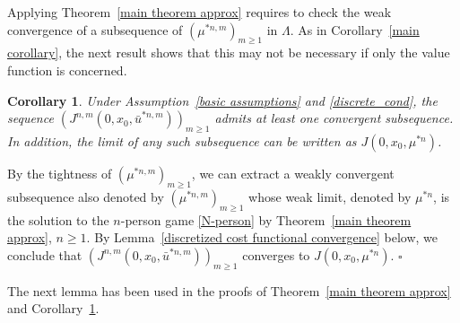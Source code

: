 \documentclass[12pt]{article}
\newtheorem{corollary}[prop]{Corollary}
\theoremstyle{named}
\numberwithin{equation}{section}
\newenvironment{Proof}{\removelastskip\par\medskip \noindent{\em Proof.} \rm}{\penalty-20\null\hfill$\square$\par\medbreak}
\begin{document}
\medskip
\noindent
Applying Theorem~\ref{main theorem approx} requires to check the
weak convergence of a subsequence of $( \mu^{*{n},{m}} )_{{m}\geq 1}$
in $\Lambda$.
As in Corollary~\ref{main corollary}, the next result
shows that this may not be necessary
 if only the value function is concerned.
\begin{corollary}
\label{main corollary approx}
  Under Assumption~\ref{basic assumptions} and \ref{discrete_cond},
  the sequence $(J^{{n},{m}}(0,x_0,\bar{u}^{*{n},{m}}))_{{m} \geq 1}$
  admits at least one convergent subsequence.
  In addition, the limit of any such subsequence
  can be written as $J(0, x_0, \mu^{*n})$.
\end{corollary}
\begin{Proof}
  By the tightness of $( \mu^{*{n},{m}} )_{{m} \geq 1}$, we can extract a weakly convergent subsequence also denoted by $( \mu^{*{n},{m}} )_{m \geq 1}$
  whose weak limit, denoted by $\mu^{*n}$,
  is the solution to the $n$-person game \eqref{N-person}
  by Theorem~\ref{main theorem approx}, $n\geq 1$.
    By Lemma~\ref{discretized cost functional convergence} below,
    we conclude that
    $(J^{{n},{m}}(0,x_0,\bar{u}^{*{n},{m}}))_{m \geq 1}$ converges to $J(0, x_0, \mu^{*n})$.
\end{Proof}
\noindent
The next lemma has been used in the proofs of
Theorem~\ref{main theorem approx} and Corollary~\ref{main corollary approx}.
\end{document}
